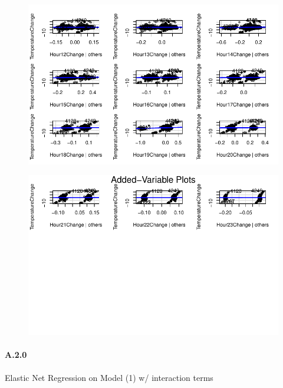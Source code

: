 \documentclass[
  letterpaper,
  DIV=11,
  numbers=noendperiod]{scrartcl}
\let\oldparagraph\paragraph
\renewcommand{\paragraph}[1]{\oldparagraph{#1}\mbox{}}
\begin{document}
\begin{figure}[H]

{\centering \includegraphics{seoul_files/figure-pdf/unnamed-chunk-10-3.pdf}

}

\end{figure}

\begin{figure}[H]

{\centering \includegraphics{seoul_files/figure-pdf/unnamed-chunk-10-4.pdf}

}

\end{figure}

\hypertarget{a20}{%
\paragraph{A.2.0}\label{a20}}

Elastic Net Regression on Model (1) w/ interaction terms
\end{document}
